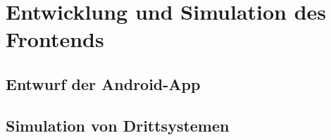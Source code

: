 \chapter{Entwicklung und Simulation des Frontends}\label{ch:Entwicklung und Simulation des Frontends}
\section{Entwurf der Android-App}\label{sec:Entwurf der Android-App}
\section{Simulation von Drittsystemen}\label{sec:Simulation von Drittsystemen}

